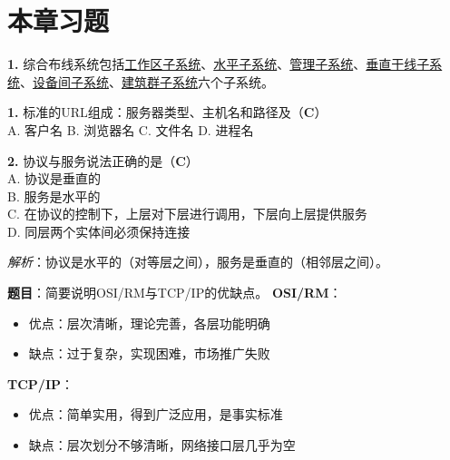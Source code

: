\section{本章习题}

\begin{examplebox}[填空题]
\textbf{1.} 综合布线系统包括\underline{工作区子系统}、\underline{水平子系统}、\underline{管理子系统}、\underline{垂直干线子系统}、\underline{设备间子系统}、\underline{建筑群子系统}六个子系统。
\end{examplebox}

\begin{examplebox}[选择题]
\textbf{1.} 标准的URL组成：服务器类型、主机名和路径及（\textbf{C}）\\
A. 客户名 \quad B. 浏览器名 \quad C. 文件名 \quad D. 进程名

\textbf{2.} 协议与服务说法正确的是（\textbf{C}）\\
A. 协议是垂直的\\
B. 服务是水平的\\
C. 在协议的控制下，上层对下层进行调用，下层向上层提供服务\\
D. 同层两个实体间必须保持连接

\textit{解析}：协议是水平的（对等层之间），服务是垂直的（相邻层之间）。
\end{examplebox}

\begin{examplebox}
\textbf{题目}：简要说明OSI/RM与TCP/IP的优缺点。
\tcblower
\textbf{OSI/RM}：
\begin{itemize}[itemsep=0pt]
    \item 优点：层次清晰，理论完善，各层功能明确
    \item 缺点：过于复杂，实现困难，市场推广失败
\end{itemize}

\textbf{TCP/IP}：
\begin{itemize}[itemsep=0pt]
    \item 优点：简单实用，得到广泛应用，是事实标准
    \item 缺点：层次划分不够清晰，网络接口层几乎为空
\end{itemize}
\end{examplebox}

